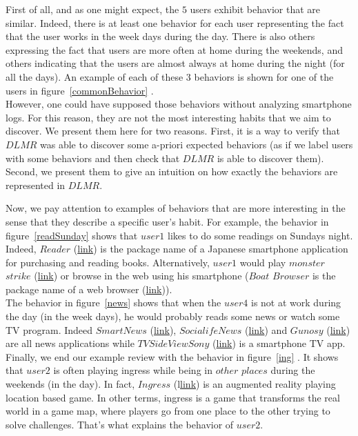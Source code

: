 First of all, and as one might expect, the $5$ users exhibit behavior that are similar. Indeed, there is at least one behavior for each user representing the fact that the user works in the week days during the day. There is also others expressing the fact that users are more often at home during the weekends, and others indicating that the users are almost always at home during the night (for all the days). An example of each of these $3$ behaviors is shown for one of the users in figure~\ref{commonBehavior} . 
\\However, one could have supposed those behaviors without analyzing smartphone logs. For this reason, they are not the most interesting habits that we aim to discover. We present them here for two reasons. First, it is a way to verify that $DLMR$ was able to discover some a-priori expected behaviors (as if we label users with some behaviors and then check that $DLMR$ is able to discover them). Second, we present them to give an intuition on how exactly the behaviors are represented in $DLMR$. \par

Now, we pay attention to examples of behaviors that are more interesting in the sense that they describe a specific user's habit. For example, the behavior in figure~\ref{readSunday} shows that $user1$ likes to do some readings on Sundays night. Indeed, $Reader$ (\href{https://play.google.com/store/apps/details?id=com.sony.drbd.reader.ext.pictorial.ja&hl=fr}{link}) is the package name of a Japanese smartphone application for purchasing and reading books. Alternatively, $user1$ would play $monster$ $strike$ (\href{https://play.google.com/store/apps/details?id=jp.co.mixi.monsterstrikeUS&hl=fr}{link}) or browse in the web using his smartphone ($Boat$ $Browser$ is the package name of a web browser (\href{https://play.google.com/store/apps/details?id=com.boatbrowser.free&hl=fr}{link})). 
\\The behavior in figure~\ref{news} shows that when the $user4$ is not at work during the day (in the week days), he would probably reads some news or watch some TV program. Indeed $SmartNews$ (\href{https://play.google.com/store/apps/details?id=jp.gocro.smartnews.android}{link}), $Socialife News$ (\href{https://play.google.com/store/apps/details?id=com.sony.nfx.app.sfrc&hl=fr}{link}) and $Gunosy$ (\href{https://play.google.com/store/apps/details?id=com.gunosy.android.world}{link}) are all news applications while $TV SideView Sony$ (\href{https://play.google.com/store/apps/details?id=com.sony.tvsideview.phone&hl=fr}{link}) is a smartphone TV app.
\\Finally, we end our example review with the behavior in figure~\ref{ing} . It shows that $user2$ is often playing ingress while being in $other$ $places$ during the weekends (in the day). In fact, $Ingress$ (l\href{https://play.google.com/store/apps/details?id=com.nianticproject.ingress&hl=fr}{link}) is an augmented reality playing location based game. In other terms, ingress is a game that transforms the real world in a game map, where players go from one place to the other trying to solve challenges. That's what explains the behavior of $user2$. \par

